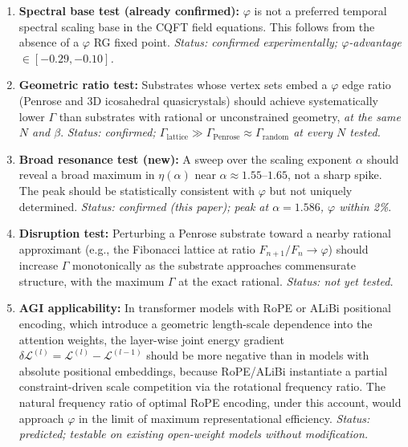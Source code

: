 \documentclass[11pt,a4paper]{article}
\theoremstyle{plain}
\theoremstyle{definition}
\newcommand{\phiGolden}{\varphi}
\newcommand{\Lag}{\mathcal{L}}
\begin{document}
\begin{enumerate}[label=\textbf{P\arabic*.}, leftmargin=*, itemsep=6pt]

  \item \textbf{Spectral base test (already confirmed):}
    $\phiGolden$ is not a preferred temporal spectral scaling base in
    the CQFT field equations. This follows from the absence of a
    $\phiGolden$ RG fixed point. \emph{Status: confirmed experimentally;
    $\phiGolden$-advantage $\in [-0.29, -0.10]$.}

  \item \textbf{Geometric ratio test:}
    Substrates whose vertex sets embed a $\phiGolden$ edge ratio (Penrose
    and 3D icosahedral quasicrystals) should achieve systematically lower
    $\Gamma$ than substrates with rational or unconstrained geometry,
    \emph{at the same $N$ and $\beta$}. \emph{Status: confirmed;
    $\Gamma_{\text{lattice}} \gg \Gamma_{\text{Penrose}} \approx
    \Gamma_{\text{random}}$ at every $N$ tested.}

  \item \textbf{Broad resonance test (new):}
    A sweep over the scaling exponent $\alpha$ should reveal a broad
    maximum in $\eta(\alpha)$ near $\alpha \approx 1.55$--$1.65$, not a
    sharp spike. The peak should be statistically consistent with
    $\phiGolden$ but not uniquely determined. \emph{Status: confirmed
    (this paper); peak at $\alpha = 1.586$, $\phiGolden$ within 2\%}.

  \item \textbf{Disruption test:}
    Perturbing a Penrose substrate toward a nearby rational approximant
    (e.g., the Fibonacci lattice at ratio $F_{n+1}/F_n \to \phiGolden$)
    should increase $\Gamma$ monotonically as the substrate approaches
    commensurate structure, with the maximum $\Gamma$ at the exact
    rational. \emph{Status: not yet tested.}

  \item \textbf{AGI applicability:}
    In transformer models with RoPE or ALiBi positional encoding,
    which introduce a geometric length-scale dependence into the attention
    weights, the layer-wise joint energy gradient
    $\delta\Lag^{(l)} = \Lag^{(l)} - \Lag^{(l-1)}$
    should be more negative than in models with absolute positional
    embeddings, because RoPE/ALiBi instantiate a partial constraint-driven
    scale competition via the rotational frequency ratio. The natural
    frequency ratio of optimal RoPE encoding, under this account, would
    approach $\phiGolden$ in the limit of maximum representational
    efficiency.
    \emph{Status: predicted; testable on existing open-weight models
    without modification.}

\end{enumerate}
\end{document}
